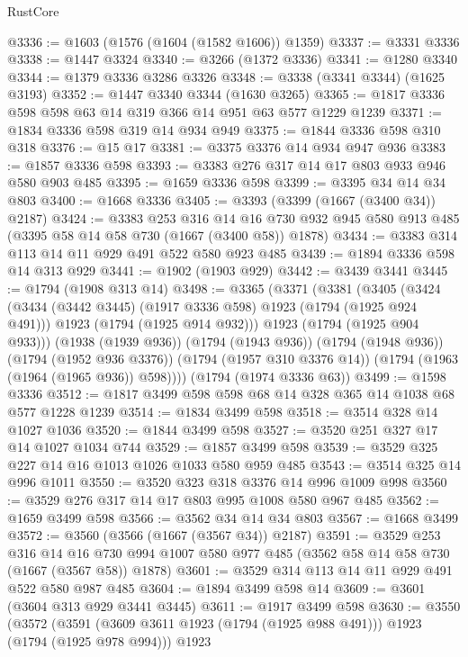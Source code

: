 \begin{lexlean}{RustCore}
\begin{coremodule}
@3336 := @1603 (@1576 (@1604 (@1582 @1606)) @1359)
@3337 := @3331 @3336
@3338 := @1447 @3324
@3340 := @3266 (@1372 @3336)
@3341 := @1280 @3340
@3344 := @1379 @3336 @3286 @3326
@3348 := @3338 (@3341 @3344) (@1625 @3193)
@3352 := @1447 @3340 @3344 (@1630 @3265)
@3365 := @1817 @3336 @598 @598 @63 @14 @319 @366 @14 @951 @63 @577 @1229 @1239
@3371 := @1834 @3336 @598 @319 @14 @934 @949
@3375 := @1844 @3336 @598 @310 @318
@3376 := @15 @17
@3381 := @3375 @3376 @14 @934 @947 @936
@3383 := @1857 @3336 @598
@3393 := @3383 @276 @317 @14 @17 @803 @933 @946 @580 @903 @485
@3395 := @1659 @3336 @598
@3399 := @3395 @34 @14 @34 @803
@3400 := @1668 @3336
@3405 := @3393 (@3399 (@1667 (@3400 @34)) @2187)
@3424 := @3383
    @253
    @316
    @14
    @16
    @730
    @932
    @945
    @580
    @913
    @485
    (@3395 @58 @14 @58 @730 (@1667 (@3400 @58)) @1878)
@3434 := @3383 @314 @113 @14 @11 @929 @491 @522 @580 @923 @485
@3439 := @1894 @3336 @598 @14 @313 @929
@3441 := @1902 (@1903 @929)
@3442 := @3439 @3441
@3445 := @1794 (@1908 @313 @14)
@3498 := @3365
    (@3371
      (@3381
        (@3405
          (@3424
            (@3434 (@3442 @3445) (@1917 @3336 @598) @1923 (@1794 (@1925 @924 @491)))
            @1923
            (@1794 (@1925 @914 @932)))
          @1923
          (@1794 (@1925 @904 @933)))
        (@1938 (@1939 @936))
        (@1794 (@1943 @936))
        (@1794 (@1948 @936))
        (@1794 (@1952 @936 @3376))
        (@1794 (@1957 @310 @3376 @14))
        (@1794 (@1963 (@1964 (@1965 @936)) @598))))
    (@1794 (@1974 @3336 @63))
@3499 := @1598 @3336
@3512 := @1817 @3499 @598 @598 @68 @14 @328 @365 @14 @1038 @68 @577 @1228 @1239
@3514 := @1834 @3499 @598
@3518 := @3514 @328 @14 @1027 @1036
@3520 := @1844 @3499 @598
@3527 := @3520 @251 @327 @17 @14 @1027 @1034 @744
@3529 := @1857 @3499 @598
@3539 := @3529 @325 @227 @14 @16 @1013 @1026 @1033 @580 @959 @485
@3543 := @3514 @325 @14 @996 @1011
@3550 := @3520 @323 @318 @3376 @14 @996 @1009 @998
@3560 := @3529 @276 @317 @14 @17 @803 @995 @1008 @580 @967 @485
@3562 := @1659 @3499 @598
@3566 := @3562 @34 @14 @34 @803
@3567 := @1668 @3499
@3572 := @3560 (@3566 (@1667 (@3567 @34)) @2187)
@3591 := @3529
    @253
    @316
    @14
    @16
    @730
    @994
    @1007
    @580
    @977
    @485
    (@3562 @58 @14 @58 @730 (@1667 (@3567 @58)) @1878)
@3601 := @3529 @314 @113 @14 @11 @929 @491 @522 @580 @987 @485
@3604 := @1894 @3499 @598 @14
@3609 := @3601 (@3604 @313 @929 @3441 @3445)
@3611 := @1917 @3499 @598
@3630 := @3550
    (@3572
      (@3591 (@3609 @3611 @1923 (@1794 (@1925 @988 @491))) @1923 (@1794 (@1925 @978 @994)))
      @1923

\end{coremodule}
\end{lexlean}
